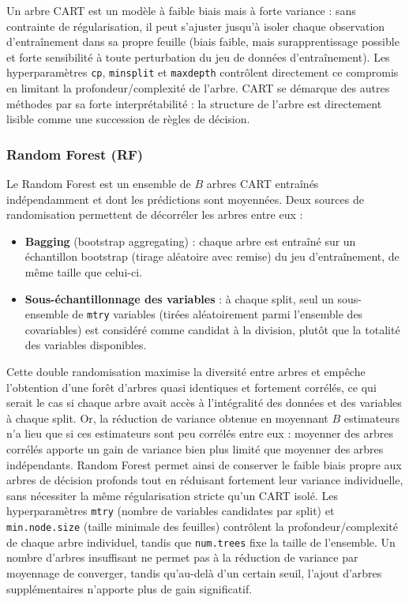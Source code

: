\documentclass[11pt,a4paper,oneside]{report}
\begin{document}
	Un arbre CART est un modèle à faible biais mais à forte variance : sans contrainte de régularisation, il peut s'ajuster jusqu'à isoler chaque observation d'entraînement dans sa propre feuille (biais faible, mais surapprentissage possible et forte sensibilité à toute perturbation du jeu de données d'entraînement). Les hyperparamètres \texttt{cp}, \texttt{minsplit} et \texttt{maxdepth} contrôlent directement ce compromis en limitant la profondeur/complexité de l'arbre. CART se démarque des autres méthodes par sa forte interprétabilité : la structure de l'arbre est directement lisible comme une succession de règles de décision.
	
	\subsubsection{Random Forest (RF)}
	Le Random Forest \cite{breiman2001random} est un ensemble de $B$ arbres CART entraînés indépendamment et dont les prédictions sont moyennées. Deux sources de randomisation permettent de décorréler les arbres entre eux :
	\begin{itemize}
		\item \textbf{Bagging} (bootstrap aggregating) : chaque arbre est entraîné sur un échantillon bootstrap (tirage aléatoire avec remise) du jeu d'entraînement, de même taille que celui-ci.
		\item \textbf{Sous-échantillonnage des variables} : à chaque split, seul un sous-ensemble de \texttt{mtry} variables (tirées aléatoirement parmi l'ensemble des covariables) est considéré comme candidat à la division, plutôt que la totalité des variables disponibles.
	\end{itemize}
	
	Cette double randomisation maximise la diversité entre arbres et empêche l'obtention d'une forêt d'arbres quasi identiques et fortement corrélés, ce qui serait le cas si chaque arbre avait accès à l'intégralité des données et des variables à chaque split. Or, la réduction de variance obtenue en moyennant $B$ estimateurs n'a lieu que si ces estimateurs sont peu corrélés entre eux : moyenner des arbres corrélés apporte un gain de variance bien plus limité que moyenner des arbres indépendants. Random Forest permet ainsi de conserver le faible biais propre aux arbres de décision profonds tout en réduisant fortement leur variance individuelle, sans nécessiter la même régularisation stricte qu'un CART isolé. Les hyperparamètres \texttt{mtry} (nombre de variables candidates par split) et \texttt{min.node.size} (taille minimale des feuilles) contrôlent la profondeur/complexité de chaque arbre individuel, tandis que \texttt{num.trees} fixe la taille de l'ensemble. Un nombre d'arbres insuffisant ne permet pas à la réduction de variance par moyennage de converger, tandis qu'au-delà d'un certain seuil, l'ajout d'arbres supplémentaires n'apporte plus de gain significatif.
	
\end{document}
